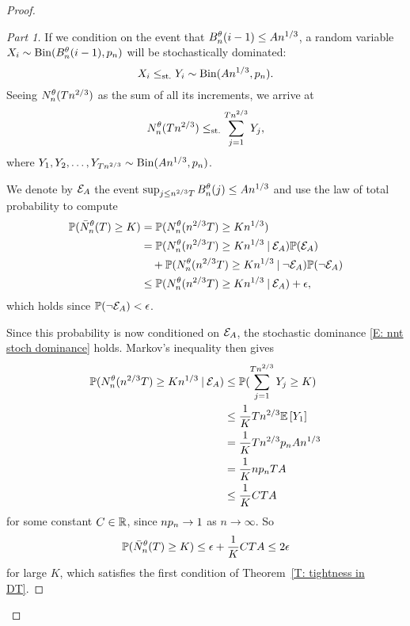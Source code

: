 \begin{proof}
\begin{proof}[Part 1]
If we condition on the event that $B_n^{\theta}(i-1) \leq An^{1 / 3}$, a random variable $X_i \sim \operatorname*{Bin}(B_n^{\theta}(i-1), p_n)$ will be stochastically dominated:
\begin{equation}
X_i \leq_{\text{st.}} Y_i \sim \operatorname*{Bin}(An^{1 / 3}, p_n).
\end{equation}
Seeing $N_n^{\theta}(Tn^{2 / 3})$ as the sum of all its increments, we arrive at
\begin{equation} \label{E: nnt stoch dominance}
N_n^{\theta}(Tn^{2 / 3}) \leq_{\text{st.}} \sum_{j=1}^{Tn^{2 / 3}} Y_j,
\end{equation}
where $Y_1, Y_2, \dots, Y_{Tn^{2 / 3}} \sim \operatorname*{Bin}(An^{1 / 3}, p_n)$.

We denote by $\mathcal{E}_{A}$ the event $\sup_{j \leq n^{2 / 3}T} B_n^{\theta}(j) \leq An^{1 / 3}$ and use the law of total probability to compute
\begin{equation} \label{E: First Total Probability Argument}
\begin{aligned}
\mathbb{P}(\bar{N}_n^{\theta}(T) \geq K) 
&= \mathbb{P}(N_n^{\theta}(n^{2 / 3}T) \geq Kn^{1 / 3}) \\
&=  \mathbb{P}(N_n^{\theta}(n^{2 / 3}T) \geq Kn^{1 / 3} \: | \: \mathcal{E}_{A}) \mathbb{P}(\mathcal{E}_{A}) \\
&\quad + \mathbb{P}(N_n^{\theta}(n^{2 / 3}T) \geq Kn^{1 / 3} \: | \: \neg\mathcal{E}_{A}) \mathbb{P}(\neg \mathcal{E}_{A}) \\
&\leq \mathbb{P}(N_n^{\theta}(n^{2 / 3}T) \geq Kn^{1 / 3} \: | \: \mathcal{E}_{A}) + \epsilon, \\
\end{aligned}	
\end{equation}
which holds since $\mathbb{P}(\neg\mathcal{E}_{A}) <\epsilon$.

Since this probability is now conditioned on $\mathcal{E}_{A}$, the stochastic dominance \eqref{E: nnt stoch dominance} holds.
Markov's inequality then gives
\begin{align*}
\mathbb{P}(N_n^{\theta}(n^{2 / 3}T) \geq Kn^{1 / 3} \: | \: \mathcal{E}_{A}) 
&\leq \mathbb{P}( \sum_{j=1}^{Tn^{2 / 3}} Y_j \geq K) \\
&\leq \frac{1}{K}Tn^{2 / 3} \mathbb{E} \left[ Y_1 \right] \\
&= \frac{1}{K}Tn^{2 / 3} p_n An^{1 / 3} \\
&= \frac{1}{K}np_n TA \\
&\leq \frac{1}{K}CTA
\end{align*}
for some constant $C \in \mathbb{R}$, since $np_n \rightarrow 1$ as $n \rightarrow \infty$.
So
\begin{equation}
\mathbb{P}(\bar{N}_n^{\theta}(T) \geq K) \leq \epsilon + \frac{1}{K}CTA \leq 2 \epsilon
\end{equation}
for large $K$, which satisfies the first condition of Theorem~\ref{T: tightness in DT}.


\end{proof}
\end{proof}
